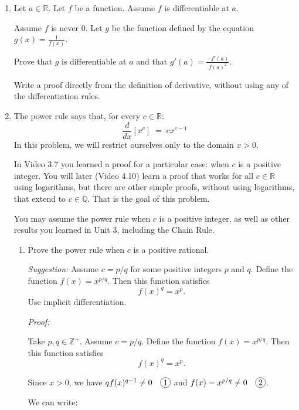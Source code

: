 \documentclass[12pt]{exam}
\newcommand*\circled[1]{\tikz[baseline=(char.base)]{
    \node[shape=circle, draw, inner sep=1pt, 
        minimum height=12pt] (char) {#1};}}
\newcommand {\DS} [1] {${\displaystyle #1}$}
\newcommand{\vv}{\vspace{.4cm}}
\newcommand{\R}{\mathbb{R}}
\newcommand{\Q}{\mathbb{Q}}
\newcommand{\Z}{\mathbb{Z}}
\begin{document}
\begin{enumerate}[resume]

\vv

\item  \label{qu:quotient} 
Let $a \in \R$.  Let $f$ be a function.  Assume $f$ is differentiable at $a$. 

Assume $f$ is never $0$.  Let $g$ be the function defined by the equation \DS{g(x) = \frac{1}{f(x)}}.

Prove that $g$ is differentiable at $a$ and that \DS{g'(a) =  \frac{-f'(a)}{f(a)^2}}. 

Write a proof directly from the definition of derivative, without using any of the differentiation rules.

\vv

\item \label{qu:power}  The power rule says that, for every $c \in \R$:
	$$
		\frac{d}{dx} \left[ x^c \right]  \; = \; c x^{c-1}
	$$
In this problem, we will restrict ourselves only to the domain $x>0$.

In Video 3.7 you learned a proof for a particular case: when $c$ is a positive integer.  You will later (Video 4.10) learn a proof that works for all $c \in \R$ using logarithms, but there are other simple proofs, without using logarithms, that extend to $c \in \Q$.  That is the goal of this problem.
	
You may assume the power rule when $c$ is a positive integer, as well as other results you learned in Unit 3, including the Chain Rule.
	\begin{enumerate}
		\item  Prove the power rule when $c$ is a positive rational.
		
		\emph{Suggestion:}  Assume $c=p/q$ for some positive integers $p$ and $q$.    Define the function $f(x)=x^{p/q}$.  Then this function satisfies
			$$
				f(x)^q = x^p.
			$$
			Use implicit differentiation.

		\vv

			
		\emph{Proof: }

		Take $p, q \in \Z^+$. Assume $c=p/q$. Define the function $f(x)=x^{p/q}$.  Then this function satisfies
		$$
			f(x)^q = x^p. 
		$$

		Since $x > 0$, we have $qf(x)^{q - 1} \neq 0 \quad \circled{1}$ and $f(x)=x^{p/q} \neq 0 \quad \circled{2}$.

		We can write:


\end{enumerate}
\end{enumerate}
\end{document}
